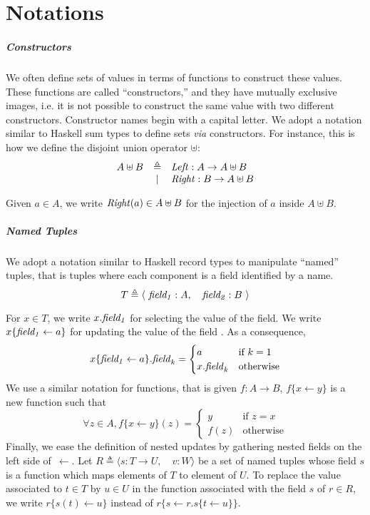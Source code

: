 \chapter{Notations}
\label{frontmatter:notations}

\paragraph{Constructors}
%
We often define sets of values in terms of functions to construct these values.
%
These functions are called ``constructors,'' and they have mutually exclusive
images, i.e. it is not possible to construct the same value with two different
constructors.
%
Constructor names begin with a capital letter.
%
We adopt a notation similar to Haskell sum types to define sets \emph{via}
constructors.
%
For instance, this is how we define the disjoint union operator $\uplus$:
%
\[
  \begin{array}{rcl}
    A \uplus B & \triangleq & \mathit{Left} : A \rightarrow A \uplus B \\
               & |          & \mathit{Right} : B \rightarrow A \uplus B
  \end{array}
\]

Given $a \in A$, we write $\mathit{Right}(a) \in A \uplus B$ for the injection of
$a$ inside $A \uplus B$.

\paragraph{Named Tuples}
%
We adopt a notation similar to Haskell record types to manipulate ``named''
tuples, that is tuples where each component is a field identified by a name.
%
\[
  T \triangleq \langle~\mathit{field_1} : A,\quad\mathit{field_2} : B~\rangle
\]

For $x \in T$, we write $x.\mathit{field_1}$ for selecting the value of the
 field. We write $x \{ \mathit{field_1} \leftarrow a \}$ for
updating the value of the field . As a consequence,
%
\[
  x \{ \mathit{field_1} \leftarrow a \}.\mathit{field}_k = \begin{cases}
    a & \text{if } k = 1 \\
    x.\mathit{field}_k & \text{otherwise}
  \end{cases}
\]
%
We use a similar notation for functions, that is given
\( f : A \rightarrow B \), \( f \{ x \leftarrow y \} \) is a new function such
that
%
\[
  \forall z \in A, f \{ x \leftarrow y \}(z) = \begin{cases}
    y & \text{if } z = x \\
    f(z) & \text{otherwise}
  \end{cases}
\]
%
Finally, we ease the definition of nested updates by gathering nested fields on
the left side of~\( \leftarrow \).
%
Let \( R \triangleq \langle s : T \rightarrow U,\quad v : W \rangle \) be a set
of named tuples whose field \( s \) is a function which maps elements of \( T \)
to element of \( U \).
%
To replace the value associated to \( t \in T \) by \( u \in U \) in the
function associated with the field \( s \) of \( r \in R \), we write
\( r \{ s(t) \leftarrow u \} \) instead of
\( r \{ s \leftarrow r.s \{ t \leftarrow u \} \} \).
